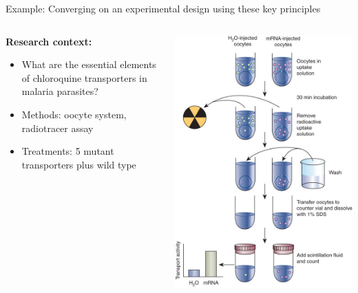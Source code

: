 \documentclass{beamer}
\begin{document}
\begin{frame}{Example: Converging on an experimental design using these key principles}
 \begin{columns}
  \begin{column}{0.5\textwidth}
  \textbf{Research context:}
    \begin{itemize}
     \item What are the essential elements of chloroquine transporters in malaria parasites?
     \item Methods: oocyte system, radiotracer assay
     \item Treatments: 5 mutant transporters plus wild type
    \end{itemize}
  \end{column}
  \begin{column}{0.5\textwidth}
    \includegraphics[height=0.8\textheight]{Figures/expdesign}
  \end{column}

 \end{columns}

\end{frame}
\end{document}
